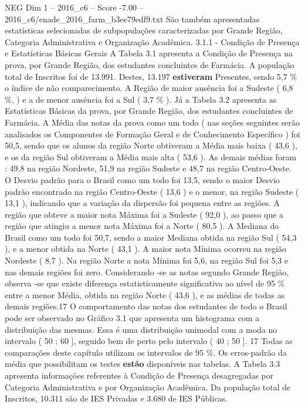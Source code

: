 \begin{textsample}{NEG Dim 1 – 2016\_c6 – Score -7.00 – 2016\_c6/enade\_2016\_farm\_b3ee79edf9.txt}
São também apresentadas estatísticas selecionadas de subpopulações caracterizadas por Grande Região, Categoria Administrativa e Organização Acadêmica. 3.1.1 - Condição de Presença e Estatísticas Básicas Gerais A Tabela 3.1 apresenta a Condição de Presença na prova, por Grande Região, dos estudantes concluintes de Farmácia.
A população total de Inscritos foi de 13.991.
Destes, 13.197 \textbf{estiveram} Presentes, sendo 5,7 \% o índice de não comparecimento.
A Região de maior ausência foi a Sudeste ( 6,8 \%, ) e a de menor ausência foi a Sul ( 3,7 \% ).
Já a Tabela 3.2 apresenta as Estatísticas Básicas da prova, por Grande Região, dos estudantes concluintes de Farmácia.
A Média das notas da prova como um todo ( nas seções seguintes serão analisados os Componentes de Formação Geral e de Conhecimento Específico ) foi 50,5, sendo que os alunos da região Norte obtiveram a Média mais baixa ( 43,6 ), e os da região Sul obtiveram a Média mais alta ( 53,6 ).
As demais médias foram : 49,8 na região Nordeste, 51,9 na região Sudeste e 48,7 na região Centro-Oeste.
O Desvio padrão para o Brasil como um todo foi 13,5, sendo o maior Desvio padrão encontrado na região Centro-Oeste ( 13,6 ) e o menor, na região Sudeste ( 13,1 ), indicando que a variação da dispersão foi pequena entre as regiões.
A região que obteve a maior nota Máxima foi a Sudeste ( 92,0 ), ao passo que a região que atingiu a menor nota Máxima foi a Norte ( 80,5 ).
A Mediana do Brasil como um todo foi 50,7, sendo a maior Mediana obtida na região Sul ( 54,3 ), e a menor obtida na Norte ( 43,1 ).
A maior nota Mínima ocorreu na região Nordeste ( 8,7 ).
Na região Norte a nota Mínima foi 5,6, na região Sul foi 5,3 e nas demais regiões foi zero.
Considerando -se as notas segundo Grande Região, observa -se que existe diferença estatisticamente significativa ao nível de 95 \% entre a menor Média, obtida na região Norte ( 43,6 ), e as médias de todas as demais regiões.17 O comportamento das notas dos estudantes de todo o Brasil pode ser observado no Gráfico 3.1 que apresenta um histograma com a distribuição das mesmas.
Essa é uma distribuição unimodal com a moda no intervalo ( 50 ; 60 ], seguido bem de perto pelo intervalo ( 40 ; 50 ]. 17 Todas as comparações deste capítulo utilizam os intervalos de 95 \%.
Os erros-padrão da média que possibilitam os testes \textbf{estão} disponíveis nas tabelas.
A Tabela 3.3 apresenta informações referentes à Condição de Presença desagregadas por Categoria Administrativa e por Organização Acadêmica.
Da população total de Inscritos, 10.311 são de IES Privadas e 3.680 de IES Públicas.

\end{textsample}
